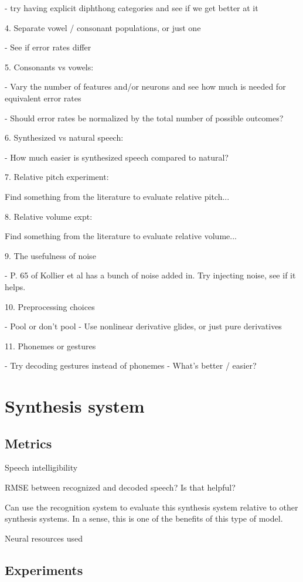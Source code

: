 - try having explicit diphthong categories and see
  if we get better at it

4. Separate vowel / consonant populations, or just one

- See if error rates differ

5. Consonants vs vowels:

- Vary the number of features and/or neurons and see
  how much is needed for equivalent error rates

  - Should error rates be normalized by the total number
    of possible outcomes?

6. Synthesized vs natural speech:

- How much easier is synthesized speech compared to natural?

7. Relative pitch experiment:

Find something from the literature to evaluate relative pitch...

8. Relative volume expt:

Find something from the literature to evaluate relative volume...

9. The usefulness of noise

- P. 65 of Kollier et al has a bunch of noise added in.
  Try injecting noise, see if it helps.

10. Preprocessing choices

- Pool or don't pool
- Use nonlinear derivative glides, or just pure derivatives

11. Phonemes or gestures

- Try decoding gestures instead of phonemes
- What's better / easier?

\section{Synthesis system}

\subsection{Metrics}

Speech intelligibility

RMSE between recognized and decoded speech?
Is that helpful?

Can use the recognition system to evaluate
this synthesis system relative to other
synthesis systems.
In a sense, this is one of the benefits
of this type of model.

Neural resources used

\subsection{Experiments}

